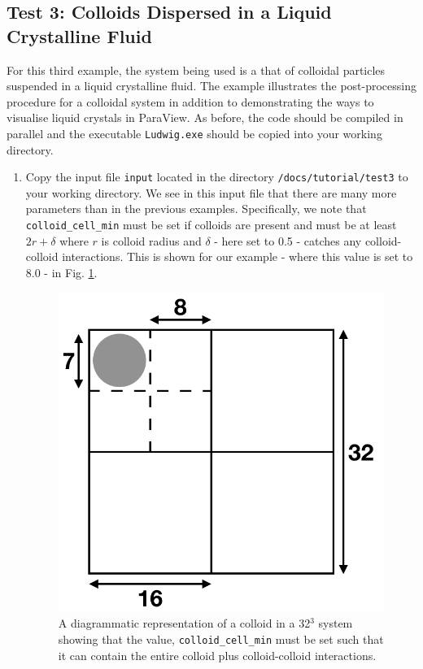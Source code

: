 \documentclass[11pt,twoside,a4paper]{article}
\begin{document}
\subsection{Test 3: Colloids Dispersed in a Liquid Crystalline Fluid}

For this third example, the system being used is a that of colloidal particles suspended in 
a liquid crystalline fluid.
The example illustrates the post-processing procedure for a colloidal system in addition to 
demonstrating the ways to visualise liquid crystals in ParaView. 
As before, the code should be compiled in parallel and the executable 
\texttt{Ludwig.exe} should be copied into your working directory.

\begin{enumerate}
\item Copy the input file \texttt{input} located in the directory 
\texttt{/docs/tutorial/test3} to your working directory. We see in this input file that 
there are many more parameters 
than in the previous examples. Specifically, we note that \texttt{colloid\_cell\_min} 
must be set if colloids are present and must be at least $2r + \delta$ where $r$ is colloid 
radius and $\delta$ - here set to 0.5 - catches any colloid-colloid interactions. This is shown for our example - where this value is set to 8.0 - in Fig. \ref{fig:colloid_int}.

 \begin{figure}[H]
\begin{center}
\includegraphics[width=0.5\linewidth]{colloidInit.png}
  \caption{A diagrammatic representation of a colloid in a 32$^3$ system showing that the value, \texttt{colloid\_cell\_min} must be set such that it can contain the entire colloid plus colloid-colloid interactions.}
  \label{fig:colloid_int}
  \end{center}
\end{figure}


\end{enumerate}
\end{document}
